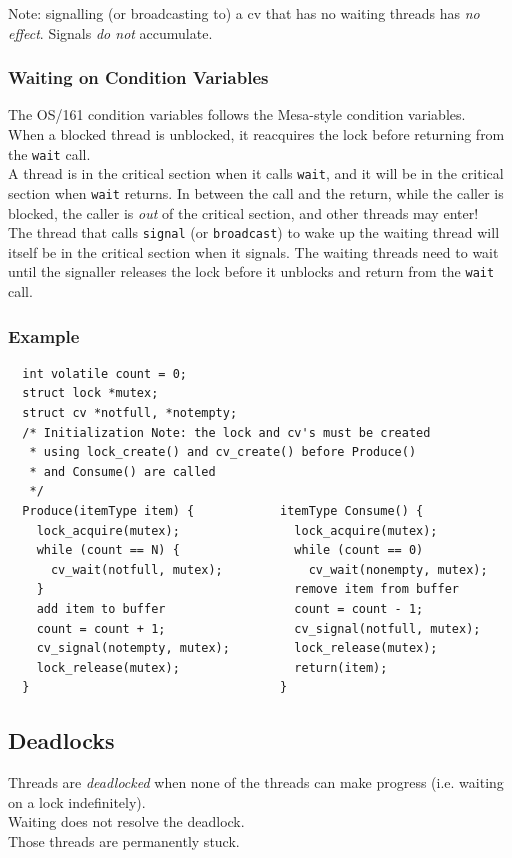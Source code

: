 \documentclass[12pt]{article}
\theoremstyle{plain}
\theoremstyle{definition}
\begin{document}
Note: signalling (or broadcasting to) a cv that has no waiting threads has \emph{no effect}.
Signals \emph{do not} accumulate.

\subsubsection{Waiting on Condition Variables}
The OS/161 condition variables follows the Mesa-style condition variables. \\
When a blocked thread is unblocked, it reacquires the lock before returning from the \texttt{wait} call. \\
A thread is in the critical section when it calls \texttt{wait}, and it will be in the critical section when \texttt{wait} returns.
In between the call and the return, while the caller is blocked, the caller is \emph{out} of the critical section, and other threads may enter! \\
The thread that calls \texttt{signal} (or \texttt{broadcast}) to wake up the waiting thread will itself be in the critical section when it signals.
The waiting threads need to wait until the signaller releases the lock before it unblocks and return from the \texttt{wait} call.

\subsubsection{Example}
\begin{verbatim}
  int volatile count = 0;
  struct lock *mutex;
  struct cv *notfull, *notempty;
  /* Initialization Note: the lock and cv's must be created
   * using lock_create() and cv_create() before Produce()
   * and Consume() are called
   */
  Produce(itemType item) {            itemType Consume() {
    lock_acquire(mutex);                lock_acquire(mutex);
    while (count == N) {                while (count == 0)
      cv_wait(notfull, mutex);            cv_wait(nonempty, mutex);
    }                                   remove item from buffer
    add item to buffer                  count = count - 1;
    count = count + 1;                  cv_signal(notfull, mutex);
    cv_signal(notempty, mutex);         lock_release(mutex);
    lock_release(mutex);                return(item);
  }                                   }
\end{verbatim}

\subsection{Deadlocks}
Threads are \emph{deadlocked} when none of the threads can make progress (i.e. waiting on a lock indefinitely). \\
Waiting does not resolve the deadlock. \\
Those threads are permanently stuck.
\end{document}
